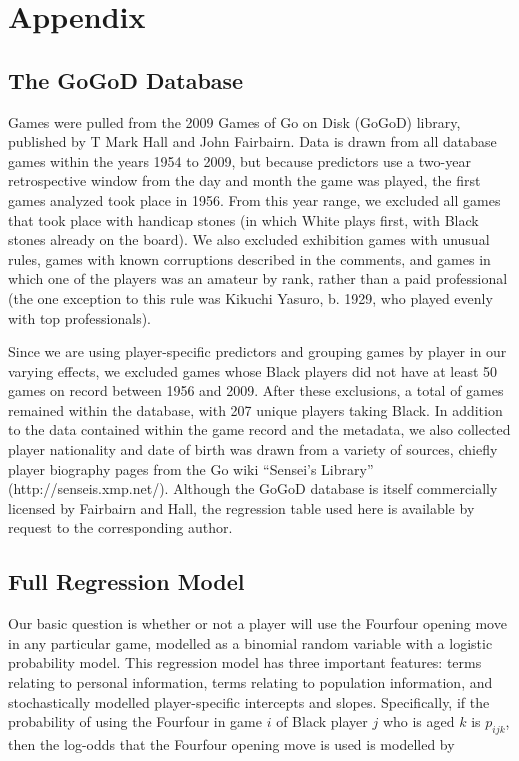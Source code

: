\documentclass[12pt]{article}
\begin{document}
\newpage

\section{Appendix}

\subsection{The GoGoD Database}

Games were pulled from the 2009 Games of Go on Disk (GoGoD) library, published by T Mark Hall and John Fairbairn. Data is drawn from all database games within the years 1954 to 2009, but because predictors use a two-year retrospective window from the day and month the game was played, the first games analyzed took place in 1956. From this year range, we excluded all games that took place with handicap stones (in which White plays first, with Black stones already on the board). We also excluded exhibition games with unusual rules, games with known corruptions described in the comments, and games in which one of the players was an amateur by rank, rather than a paid professional (the one exception to this rule was Kikuchi Yasuro, b. 1929, who played evenly with top professionals).

Since we are using player-specific predictors and grouping games by player in our varying effects, we excluded games whose Black players did not have at least 50 games on record between 1956 and 2009. After these exclusions, a total of \nGamesExcluded{} games remained within the database, with 207 unique players taking Black. In addition to the data contained within the game record and the metadata, we also collected player nationality and date of birth was drawn from a variety of sources, chiefly player biography pages from the Go wiki ``Sensei's Library'' (http://senseis.xmp.net/). Although the GoGoD database is itself commercially licensed by Fairbairn and Hall, the regression table used here is available by request to the corresponding author.


\subsection{Full Regression Model}

Our basic question is whether or not a player will use the Fourfour opening move in any particular game, modelled as a binomial random variable with a logistic probability model. This regression model has three important features: terms relating to personal information, terms relating to population information, and stochastically modelled player-specific intercepts and slopes. Specifically, if the probability of using the Fourfour in game $i$ of Black player $j$ who is aged $k$ is $p_{ijk}$, then the log-odds that the Fourfour opening move is used is modelled by
\end{document}

